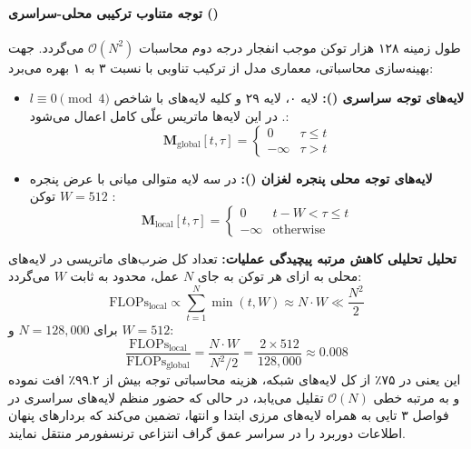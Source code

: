 \paragraph*{توجه متناوب ترکیبی محلی-سراسری ()}
طول زمینه ۱۲۸ هزار توکن موجب انفجار درجه دوم محاسبات $\mathcal{O}(N^2)$ می‌گردد. جهت بهینه‌سازی محاسباتی، معماری مدل از ترکیب تناوبی با نسبت ۳ به ۱ بهره می‌برد:
\begin{itemize}
    \item \textbf{لایه‌های توجه سراسری ():} لایه ۰، لایه ۲۹ و کلیه لایه‌های با شاخص $l \equiv 0 \pmod 4$. در این لایه‌ها ماتریس علّی کامل اعمال می‌شود:
    \begin{equation}
        \mathbf{M}_{\text{global}}[t, \tau] = \begin{cases} 0 & \tau \le t \\ -\infty & \tau > t \end{cases}
    \end{equation}
    \item \textbf{لایه‌های توجه محلی پنجره لغزان ():} در سه لایه متوالی میانی با عرض پنجره $W = 512$ توکن \cite{beltagy2020longformer, zaheer2021big}:
    \begin{equation}
        \mathbf{M}_{\text{local}}[t, \tau] = \begin{cases} 0 & t - W < \tau \le t \\ -\infty & \text{otherwise} \end{cases}
    \end{equation}
\end{itemize}

\textbf{تحلیل تحلیلی کاهش مرتبه پیچیدگی عملیات:}
تعداد کل ضرب‌های ماتریسی در لایه‌های محلی به ازای هر توکن به جای $N$ عمل، محدود به ثابت $W$ می‌گردد:
\begin{equation}
    \text{FLOPs}_{\text{local}} \propto \sum_{t=1}^N \min(t, W) \approx N \cdot W \ll \frac{N^2}{2}
\end{equation}
برای $N = 128{,}000$ و $W = 512$:
\begin{equation}
    \frac{\text{FLOPs}_{\text{local}}}{\text{FLOPs}_{\text{global}}} = \frac{N \cdot W}{N^2 / 2} = \frac{2 \times 512}{128{,}000} \approx 0.008
\end{equation}
این یعنی در ۷۵٪ از کل لایه‌های شبکه، هزینه محاسباتی توجه بیش از ۹۹.۲٪ افت نموده و به مرتبه خطی $\mathcal{O}(N)$ تقلیل می‌یابد، در حالی که حضور منظم لایه‌های سراسری در فواصل ۳ تایی به همراه لایه‌های مرزی ابتدا و انتها، تضمین می‌کند که بردارهای پنهان اطلاعات دوربرد را در سراسر عمق گراف انتزاعی ترنسفورمر منتقل نمایند.

